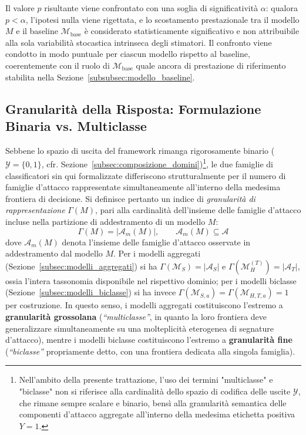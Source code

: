 Il valore $p$ risultante viene confrontato con una soglia di significatività $\alpha$: qualora $p < \alpha$, l'ipotesi nulla viene rigettata, e lo scostamento prestazionale tra il modello $M$ e il baseline $\mathcal{M}_{\text{base}}$ è considerato statisticamente significativo e non attribuibile alla sola variabilità stocastica intrinseca degli stimatori. Il confronto viene condotto in modo puntuale per ciascun modello rispetto al baseline, coerentemente con il ruolo di $\mathcal{M}_{\text{base}}$ quale ancora di prestazione di riferimento stabilita nella Sezione~\ref{subsubsec:modello_baseline}.

\subsection{Granularità della Risposta: Formulazione Binaria vs. Multiclasse}
\label{subsec:granularita_risposta}

Sebbene lo spazio di uscita del framework rimanga rigorosamente binario ($\mathcal{Y} = \{0,1\}$, cfr. Sezione~\ref{subsec:composizione_domini})\footnote{Nell'ambito della presente trattazione, l'uso dei termini "multiclasse" e "biclasse" non si riferisce alla cardinalità dello spazio di codifica delle uscite $\mathcal{Y}$, che rimane sempre scalare e binario, bensì alla granularità semantica delle componenti d'attacco aggregate all'interno della medesima etichetta positiva $Y=1$.}, le due famiglie di classificatori sin qui formalizzate differiscono strutturalmente per il numero di famiglie d'attacco rappresentate simultaneamente all'interno della medesima frontiera di decisione. Si definisce pertanto un indice di \textit{granularità di rappresentazione} $\Gamma(M)$, pari alla cardinalità dell'insieme delle famiglie d'attacco incluse nella partizione di addestramento di un modello $M$:
\begin{equation}
    \Gamma(M) = \left| \mathcal{A}_m(M) \right|, \qquad \mathcal{A}_m(M) \subseteq \mathcal{A}
    \label{eq:granularity_index}
\end{equation}
dove $\mathcal{A}_m(M)$ denota l'insieme delle famiglie d'attacco osservate in addestramento dal modello $M$. Per i modelli aggregati (Sezione~\ref{subsec:modelli_aggregati}) si ha $\Gamma(\mathcal{M}_S) = |\mathcal{A}_S|$ e $\Gamma(\mathcal{M}_H^{(T)}) = |\mathcal{A}_T|$, ossia l'intera tassonomia disponibile nel rispettivo dominio; per i modelli biclasse (Sezione~\ref{subsec:modelli_biclasse}) si ha invece $\Gamma(\mathcal{M}_{S,a}) = \Gamma(\mathcal{M}_{H,T,a}) = 1$ per costruzione. In questo senso, i modelli aggregati costituiscono l'estremo a \textbf{granularità grossolana} (\textit{``multiclasse''}, in quanto la loro frontiera deve generalizzare simultaneamente su una molteplicità eterogenea di segnature d'attacco), mentre i modelli biclasse costituiscono l'estremo a \textbf{granularità fine} (\textit{``biclasse''} propriamente detto, con una frontiera dedicata alla singola famiglia).

